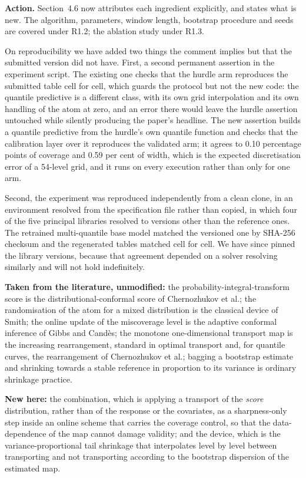 \documentclass[11pt,a4paper]{article}
\newcommand{\action}[1]{\textbf{Action.} #1}
\begin{document}
\action{Section~4.6 now attributes each ingredient explicitly, and states what is new. The algorithm, parameters, window length, bootstrap procedure and seeds are covered under R1.2; the ablation study under R1.3.

On reproducibility we have added two things the comment implies but that the submitted version did not have. First, a second permanent assertion in the experiment script. The existing one checks that the hurdle arm reproduces the submitted table cell for cell, which guards the protocol but not the new code: the quantile predictive is a different class, with its own grid interpolation and its own handling of the atom at zero, and an error there would leave the hurdle assertion untouched while silently producing the paper's headline. The new assertion builds a quantile predictive from the hurdle's own quantile function and checks that the calibration layer over it reproduces the validated arm; it agrees to 0.10 percentage points of coverage and 0.59 per cent of width, which is the expected discretisation error of a 54-level grid, and it runs on every execution rather than only for one arm.

Second, the experiment was reproduced independently from a clean clone, in an environment resolved from the specification file rather than copied, in which four of the five principal libraries resolved to versions other than the reference ones. The retrained multi-quantile base model matched the versioned one by SHA-256 checksum and the regenerated tables matched cell for cell. We have since pinned the library versions, because that agreement depended on a solver resolving similarly and will not hold indefinitely.}

\textbf{Taken from the literature, unmodified:} the probability-integral-transform score is the distributional-conformal score of Chernozhukov et al.; the randomisation of the atom for a mixed distribution is the classical device of Smith; the online update of the miscoverage level is the adaptive conformal inference of Gibbs and Cand\`es; the monotone one-dimensional transport map is the increasing rearrangement, standard in optimal transport and, for quantile curves, the rearrangement of Chernozhukov et al.; bagging a bootstrap estimate and shrinking towards a stable reference in proportion to its variance is ordinary shrinkage practice.

\textbf{New here:} the combination, which is applying a transport of the \emph{score} distribution, rather than of the response or the covariates, as a sharpness-only step inside an online scheme that carries the coverage control, so that the data-dependence of the map cannot damage validity; and the device, which is the variance-proportional tail shrinkage that interpolates level by level between transporting and not transporting according to the bootstrap dispersion of the estimated map.
\end{document}
